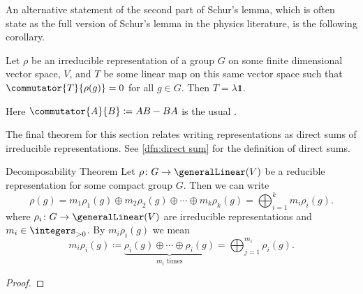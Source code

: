 \documentclass[fleqn]{NotesClass}
\newcommand*{\positiveintegers}{\integers_{>0}}
\newcommand*{\ident}{\mathbf{1}}
\newcommand*{\directsum}{\oplus}
\begin{document}
    An alternative statement of the second part of Schur's lemma, which is often state as the full version of Schur's lemma in the physics literature, is the following corollary.
    \begin{crl}{}{}
        Let \(\rho\) be an irreducible representation of a group \(G\) on some finite dimensional vector space, \(V\), and \(T\) be some linear map on this same vector space such that \(\commutator{T}{\rho(g)} = 0\) for all \(g \in G\).
        Then \(T = \lambda\ident\).
        
        \begin{rmk}
            Here \(\commutator{A}{B} \coloneqq AB - BA\) is the usual .
        \end{rmk}
    \end{crl}

    The final theorem for this section relates writing representations as direct sums of irreducible representations.
    See \cref{dfn:direct sum} for the definition of direct sums.
    
    \begin{thm}{Decomposability Theorem}{}
        Let \(\rho \colon G \to \generalLinear(V)\) be a reducible representation for some compact group \(G\).
        Then we can write
        \begin{equation}
            \rho(g) = m_1 \rho_1(g) \directsum m_2 \rho_2(g) \directsum \dotsb \directsum m_k\rho_k(g) = \bigoplus_{i=1}^{k} m_i\rho_i(g).
        \end{equation}
        where \(\rho_i \colon G \to \generalLinear(V)\) are irreducible representations and \(m_i \in \positiveintegers\).
        By \(m_i \rho_i(g)\) we mean
        \begin{equation}
            m_i \rho_i(g) \coloneqq \underbrace{\rho_i(g) \directsum \dotsb \directsum \rho_i(g)}_{m_i \text{ times}} = \bigoplus_{j = 1}^{m_i} \rho_i(g).
        \end{equation}
        
        \begin{proof}
        \end{proof}
    \end{thm}
    
\end{document}
